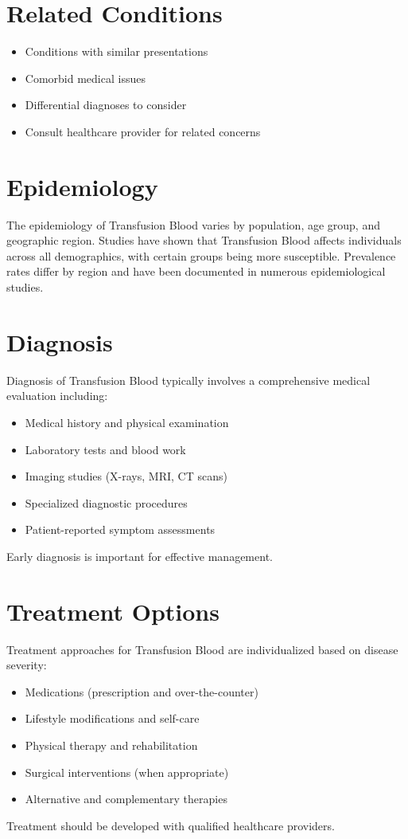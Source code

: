 \section*{Related Conditions}
\begin{itemize}
  \item Conditions with similar presentations
  \item Comorbid medical issues
  \item Differential diagnoses to consider
  \item Consult healthcare provider for related concerns
\end{itemize}

\section*{Epidemiology}
The epidemiology of Transfusion Blood varies by population, age group, and geographic region. Studies have shown that Transfusion Blood affects individuals across all demographics, with certain groups being more susceptible. Prevalence rates differ by region and have been documented in numerous epidemiological studies.

\section*{Diagnosis}
Diagnosis of Transfusion Blood typically involves a comprehensive medical evaluation including:
\begin{itemize}
  \item Medical history and physical examination
  \item Laboratory tests and blood work
  \item Imaging studies (X-rays, MRI, CT scans)
  \item Specialized diagnostic procedures
  \item Patient-reported symptom assessments
\end{itemize}
Early diagnosis is important for effective management.

\section*{Treatment Options}
Treatment approaches for Transfusion Blood are individualized based on disease severity:
\begin{itemize}
  \item Medications (prescription and over-the-counter)
  \item Lifestyle modifications and self-care
  \item Physical therapy and rehabilitation
  \item Surgical interventions (when appropriate)
  \item Alternative and complementary therapies
\end{itemize}
Treatment should be developed with qualified healthcare providers.

